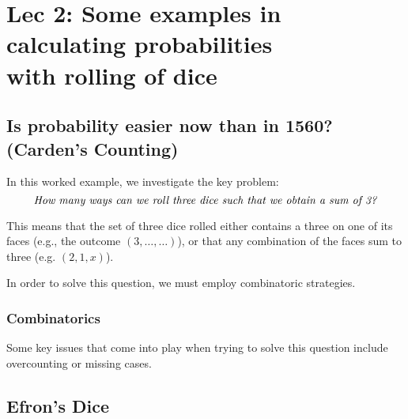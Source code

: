 \chapter[Lec 2: Some examples in calculating probabilities with rolling of dice]{Lec 2: Some examples in \\calculating probabilities \\with rolling of dice}

\section{Is probability easier now than in 1560? (Carden's Counting)}

In this worked example, we investigate the key problem: 
\[\text{\textit{How many ways can we roll three dice such that we obtain a sum of 3?}}\]

This means that the set of three dice rolled either contains 
a three on one of its faces (e.g., the outcome \((3,\ldots ,\ldots )\)), 
or that any combination of the faces sum to three (e.g. \((2,1,x)\)). 

\bigskip 

In order to solve this question, we must employ combinatoric strategies. 

\subsection{Combinatorics}

Some key issues that come into play when trying to solve this question include 
overcounting or missing cases. 

\section{Efron's Dice}
